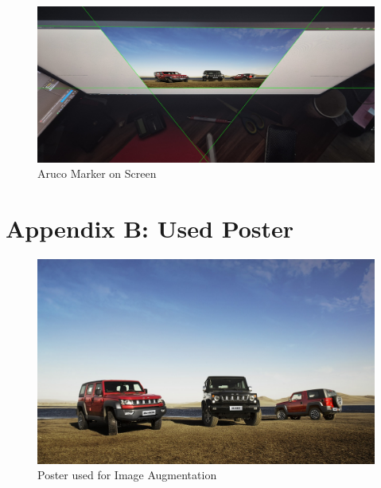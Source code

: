 \documentclass[a4paper,twocolumn]{article}
\begin{document}
\begin{figure}[h!]
    \centering
    \includegraphics[width=0.9\columnwidth]{img_alt/aruco_from_screen.jpg}
    \caption{Aruco Marker on Screen \cite{tim-schweitzer}}
    \label{fig:example-appendix}
\end{figure}

\section*{Appendix B: Used Poster}

\begin{figure}[h!]
    \centering
    \includegraphics[width=0.9\columnwidth]{img_alt/poster.jpg}
    \caption{Poster used for Image Augmentation\cite{v_speed}}
    \label{fig:img-poster}
\end{figure}
\end{document}
